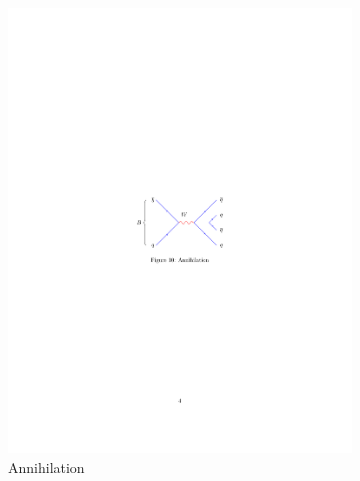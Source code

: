\begin{figure}[!h]
\begin{subfigure}[b]{0.32\textwidth}
        \includegraphics[width=1.0\textwidth]{figs/Theory/An.pdf}
        \caption{Annihilation}
    \end{subfigure}
    \begin{subfigure}[b]{0.32\textwidth}
        \centering

\end{subfigure}
\end{figure}
